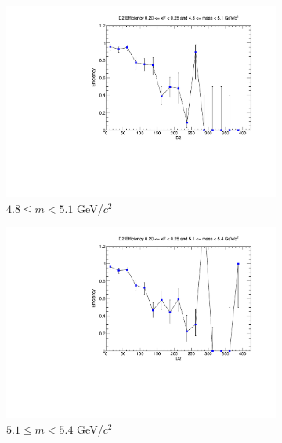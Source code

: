 \documentclass[11pt]{article}
\begin{document}
\begin{figure}[p]
\begin{subfigure}[b]{0.32\textwidth}
        \includegraphics[width=\textwidth]{./kTrackerEfficiencyPlots/D2_Efficiency_xF4_mass2.pdf}
        \caption{$4.8 \leq m < 5.1$ GeV/$c^2$}
    \end{subfigure}\vspace{0.5cm}
    \begin{subfigure}[b]{0.32\textwidth}
        \centering
        \includegraphics[width=\textwidth]{./kTrackerEfficiencyPlots/D2_Efficiency_xF4_mass3.pdf}
        \caption{$5.1 \leq m < 5.4$ GeV/$c^2$}
    \end{subfigure}\hfill
    \begin{subfigure}[b]{0.32\textwidth}
        \centering

\end{subfigure}
\end{figure}
\end{document}
